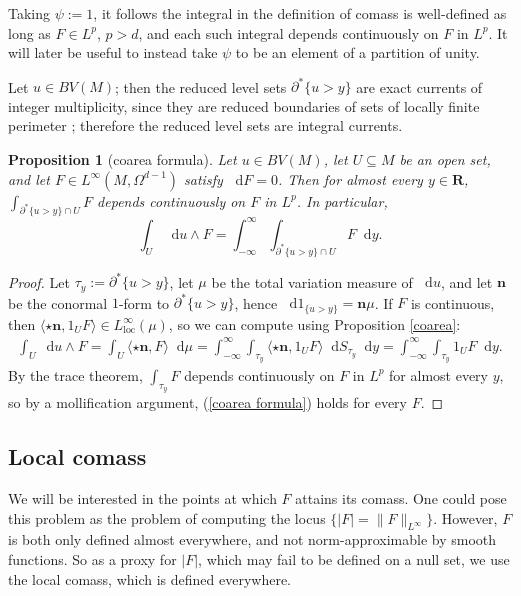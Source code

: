 \documentclass[reqno,11pt]{amsart}
\newcommand{\RR}{\mathbf{R}}
\newcommand*\dif{\mathop{}\!\mathrm{d}}
\newcommand{\normal}{\mathbf n}
\newcommand{\loc}{\mathrm{loc}}
\newtheorem{proposition}[theorem]{Proposition}
\theoremstyle{definition}
\numberwithin{equation}{section}
\begin{document}
Taking $\psi := 1$, it follows the integral in the definition of comass is well-defined as long as $F \in L^p$, $p > d$, and each such integral depends continuously on $F$ in $L^p$.
It will later be useful to instead take $\psi$ to be an element of a partition of unity.

Let $u \in BV(M)$; then the reduced level sets $\partial^* \{u > y\}$ are exact currents of integer multiplicity, since they are reduced boundaries of sets of locally finite perimeter \cite[Theorem 14.3]{Simon84}; therefore the reduced level sets are integral currents.

\begin{proposition}[coarea formula]
Let $u \in BV(M)$, let $U \subseteq M$ be an open set, and let $F \in L^\infty(M, \Omega^{d - 1})$ satisfy $\dif F = 0$.
Then for almost every $y \in \RR$, $\int_{\partial^* \{u > y\} \cap U} F$ depends continuously on $F$ in $L^p$.
In particular,
\begin{equation}\label{coarea formula}
\int_U \dif u \wedge F = \int_{-\infty}^\infty \int_{\partial^* \{u > y\} \cap U} F \dif y.
\end{equation}
\end{proposition}
\begin{proof}
Let $\tau_y := \partial^* \{u > y\}$, let $\mu$ be the total variation measure of $\dif u$, and let $\normal$ be the conormal $1$-form to $\partial^* \{u > y\}$, hence $\dif 1_{\{u > y\}} = \normal \mu$.
If $F$ is continuous, then $\langle\star \normal, 1_U F\rangle \in L^\infty_\loc(\mu)$, so we can compute using Proposition \ref{coarea}:
\begin{align*}
\int_U \dif u \wedge F = \int_U \langle \star \normal, F\rangle \dif \mu = \int_{-\infty}^\infty \int_{\tau_y} \langle \star \normal, 1_U F\rangle \dif S_{\tau_y} \dif y = \int_{-\infty}^\infty \int_{\tau_y} 1_U F \dif y.
\end{align*}
By the trace theorem, $\int_{\tau_y} F$ depends continuously on $F$ in $L^p$ for almost every $y$, so by a mollification argument, (\ref{coarea formula}) holds for every $F$.
\end{proof}



\subsection{Local comass}
We will be interested in the points at which $F$ attains its comass.
One could pose this problem as the problem of computing the locus $\{|F| = \|F\|_{L^\infty}\}$.
However, $F$ is both only defined almost everywhere, and not norm-approximable by smooth functions.
So as a proxy for $|F|$, which may fail to be defined on a null set, we use the local comass, which is defined everywhere.
\end{document}
